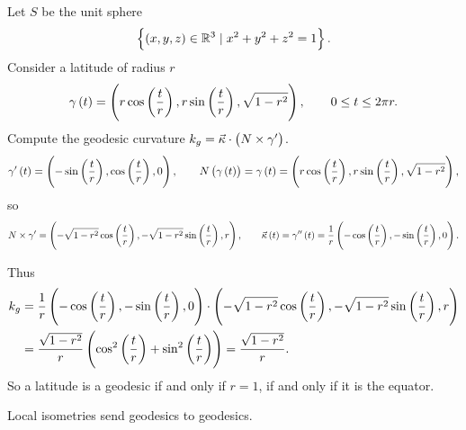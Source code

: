 \begin{example*}
Let $ S $ be the unit sphere
$$ \cbr{\br{x, y,z} \in \R^3 \mid x^2 + y^2 + z^2 = 1}. $$
Consider a latitude of radius $ r $
$$ \gamma\br{t} = \br{r\cos\br{\dfrac{t}{r}}, r\sin\br{\dfrac{t}{r}}, \sqrt{1 - r^2}}, \qquad 0 \le t \le 2\pi r. $$
Compute the geodesic curvature $ k_g = \vec{\kappa} \cdot \br{N \times \gamma'} $.
$$ \gamma'\br{t} = \br{-\sin\br{\dfrac{t}{r}}, \cos\br{\dfrac{t}{r}}, 0}, \qquad N\br{\gamma\br{t}} = \gamma\br{t} = \br{r\cos\br{\dfrac{t}{r}}, r\sin\br{\dfrac{t}{r}}, \sqrt{1 - r^2}}, $$
so
$$ N \times \gamma' = \br{-\sqrt{1 - r^2}\cos\br{\dfrac{t}{r}}, -\sqrt{1 - r^2}\sin\br{\dfrac{t}{r}}, r}, \qquad \vec{\kappa}\br{t} = \gamma''\br{t} = \dfrac{1}{r}\br{-\cos\br{\dfrac{t}{r}}, -\sin\br{\dfrac{t}{r}}, 0}. $$

\pagebreak

Thus
\begin{align*}
k_g
& = \dfrac{1}{r}\br{-\cos\br{\dfrac{t}{r}}, -\sin\br{\dfrac{t}{r}}, 0} \cdot \br{-\sqrt{1 - r^2}\cos\br{\dfrac{t}{r}}, -\sqrt{1 - r^2}\sin\br{\dfrac{t}{r}}, r} \\
& = \dfrac{\sqrt{1 - r^2}}{r}\br{\cos^2\br{\dfrac{t}{r}} + \sin^2\br{\dfrac{t}{r}}}
= \dfrac{\sqrt{1 - r^2}}{r}.
\end{align*}
So a latitude is a geodesic if and only if $ r = 1 $, if and only if it is the equator.
\end{example*}

\begin{proposition}
Local isometries send geodesics to geodesics.
\end{proposition}

